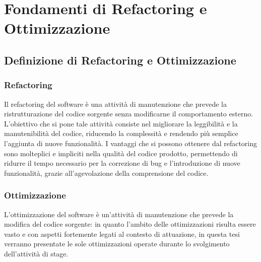 \chapter{Fondamenti di Refactoring e Ottimizzazione}
\label{chap:fondamenti-refactoring-ottimizzazione}

\section{Definizione di Refactoring e Ottimizzazione}

\subsection{Refactoring}
Il refactoring del software è una attività di manutenzione che prevede la ristrutturazione del codice sorgente senza modificarne 
il comportamento esterno. L'obiettivo che si pone tale attività consiste nel migliorare la leggibilità e la manutenibilità del codice,
riducendo la complessità e rendendo più semplice l'aggiunta di nuove funzionalità. \newline
I vantaggi che si possono ottenere dal refactoring sono molteplici e impliciti nella qualità del codice prodotto, permettendo di ridurre il 
tempo necessario per la correzione di bug e l'introduzione di nuove funzionalità, grazie all'agevolazione della comprensione del codice.

\subsection{Ottimizzazione}
L'ottimizzazione del software è un'attività di manutenzione che prevede la modifica del codice sorgente: in quanto l'ambito delle ottimizzazioni 
risulta essere vasto e con aspetti fortemente legati al contesto di attuazione, in questa tesi verranno presentate le sole ottimizzazioni operate
durante lo svolgimento dell'attività di stage. \newline


\newpage